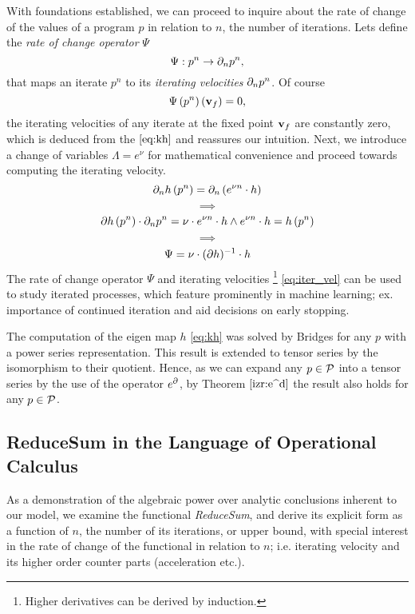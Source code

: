 With foundations established, we can proceed to inquire about the rate of change of the values of a program $p$ in relation to $n$, the number of iterations. Lets define the \emph{rate of change operator} $\Psi$ 
  \begin{equation}
    \Psi:p^n\to\partial_np^n,
  \end{equation}
that maps an iterate $p^n$ to its \emph{iterating velocities} $\partial_n p^n$. Of course
  \begin{equation}
  \Psi\left(p^n\right)\left(\mathbf{v}_f\right)=0,
  \end{equation}
the iterating velocities of any iterate at the fixed point $\mathbf{v}_f$ are constantly zero, which is deduced from the $\eqref{eq:kh}$ and reassures our intuition. Next, we introduce a change of variables $\Lambda= e^\nu$ for mathematical convenience and proceed towards computing the iterating velocity.
  $$\partial_nh\left(p^n\right)=\partial_n\left(e^{\nu n}\cdot h\right)$$
  $$\implies$$
  $$\partial h\left(p^n\right)\cdot\partial_np^n=\nu\cdot e^{\nu n}\cdot h \land e^{\nu n}\cdot h=h\left(p^n\right)$$
  $$\implies$$
  \begin{equation}\label{eq:iter_vel}
  \Psi=\nu\cdot(\partial h)^{-1}\cdot h
  \end{equation}
The rate of change operator $\Psi$ and iterating velocities
\footnote{Higher derivatives can be derived by induction.}
\eqref{eq:iter_vel} can be used to study iterated processes, which feature prominently in machine learning; ex. importance of continued iteration and aid decisions on early stopping.

The computation of the eigen map $h$ \eqref{eq:kh} was solved by Bridges \cite{bridges2016solution} for any $p$ with a power series representation. This result is extended to tensor series by the isomorphism to their quotient. Hence, as we can expand any $p\in\mathcal{P}$ into a tensor series by the use of the operator $e^\partial$, by Theorem $\ref{izr:e^d}$ the result also holds for any $p\in\mathcal{P}$. 


\subsection{ReduceSum in the Language of Operational Calculus}

As a demonstration of the algebraic power over analytic conclusions inherent to our model, we examine the functional \emph{ReduceSum}, and derive its explicit form as a function of $n$, the number of its iterations, or upper bound, with special interest in the rate of change of the functional in relation to $n$; i.e. iterating velocity and its higher order counter parts (acceleration etc.). 

